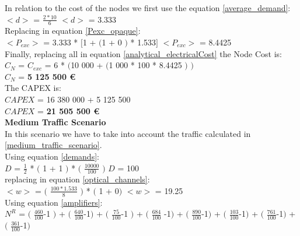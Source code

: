 In relation to the cost of the nodes we first use the equation \ref{average_demand}:\\

$<d>$ = $\frac{2 * 10}{6}$ \qquad \qquad $<d>$ = 3.333\\

Replacing in equation \ref{Pexc_opaque}:\\

$<P_{exc}>$ = 3.333 * $[$1 + $($1 + $0$ $)$ * 1.533$]$ \qquad \quad $<P_{exc}>$ = 8.4425 \\

Finally, replacing all in equation \ref{analytical_electricalCost} the Node Cost is:\\

$C_N$ = $C_{exc}$ = 6 * $($10 000 + $($1 000 * 100 * 8.4425 $)$ $)$\\

$C_N$ = \textbf{5 125 500 \euro}\\

The CAPEX is:\\
$CAPEX$ = 16 380 000 + 5 125 500\\

$CAPEX$ = \textbf{21 505 500 \euro}\\

\textbf{Medium Traffic Scenario}\\
In this scenario we have to take into account the traffic calculated in \ref{medium_traffic_scenario}.\\

Using equation \ref{demands}:\\

$D$ = $\frac{1}{2}$ * $($ 1 + 1 $)$ * $($ $\frac{10 000}{100}$ $)$ \qquad \qquad $D$ = 100\\

replacing in equation \ref{optical_channels}:\\

$<w>$ = $($ $\frac{100 * 1.533}{8}$ $)$ * $($ 1 + 0$)$ \qquad \quad $<w>$ = 19.25\\

Using equation \ref{amplifiers}:\\

$N^R$ = $($ $\frac{460}{100}$-1 $)$ + $($ $\frac{640}{100}$-1$)$ + $($ $\frac{75}{100}$-1 $)$ + $($ $\frac{684}{100}$ -1$)$ + $($ $\frac{890}{100}$-1$)$ + $($ $\frac{103}{100}$-1$)$ + $($ $\frac{761}{100}$-1$)$ + $($ $\frac{361}{100}$-1$)$\\

